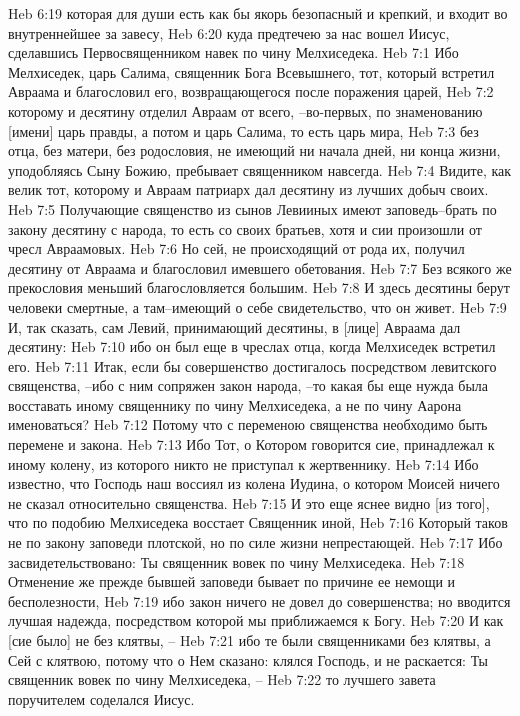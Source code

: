 Heb 6:19  которая для души есть как бы якорь безопасный и крепкий, и входит во внутреннейшее за завесу,
Heb 6:20  куда предтечею за нас вошел Иисус, сделавшись Первосвященником навек по чину Мелхиседека.
Heb 7:1  Ибо Мелхиседек, царь Салима, священник Бога Всевышнего, тот, который встретил Авраама и благословил его, возвращающегося после поражения царей,
Heb 7:2  которому и десятину отделил Авраам от всего, --во-первых, по знаменованию [имени] царь правды, а потом и царь Салима, то есть царь мира,
Heb 7:3  без отца, без матери, без родословия, не имеющий ни начала дней, ни конца жизни, уподобляясь Сыну Божию, пребывает священником навсегда.
Heb 7:4  Видите, как велик тот, которому и Авраам патриарх дал десятину из лучших добыч своих.
Heb 7:5  Получающие священство из сынов Левииных имеют заповедь--брать по закону десятину с народа, то есть со своих братьев, хотя и сии произошли от чресл Авраамовых.
Heb 7:6  Но сей, не происходящий от рода их, получил десятину от Авраама и благословил имевшего обетования.
Heb 7:7  Без всякого же прекословия меньший благословляется большим.
Heb 7:8  И здесь десятины берут человеки смертные, а там--имеющий о себе свидетельство, что он живет.
Heb 7:9  И, так сказать, сам Левий, принимающий десятины, в [лице] Авраама дал десятину:
Heb 7:10  ибо он был еще в чреслах отца, когда Мелхиседек встретил его.
Heb 7:11  Итак, если бы совершенство достигалось посредством левитского священства, --ибо с ним сопряжен закон народа, --то какая бы еще нужда была восставать иному священнику по чину Мелхиседека, а не по чину Аарона именоваться?
Heb 7:12  Потому что с переменою священства необходимо быть перемене и закона.
Heb 7:13  Ибо Тот, о Котором говорится сие, принадлежал к иному колену, из которого никто не приступал к жертвеннику.
Heb 7:14  Ибо известно, что Господь наш воссиял из колена Иудина, о котором Моисей ничего не сказал относительно священства.
Heb 7:15  И это еще яснее видно [из того], что по подобию Мелхиседека восстает Священник иной,
Heb 7:16  Который таков не по закону заповеди плотской, но по силе жизни непрестающей.
Heb 7:17  Ибо засвидетельствовано: Ты священник вовек по чину Мелхиседека.
Heb 7:18  Отменение же прежде бывшей заповеди бывает по причине ее немощи и бесполезности,
Heb 7:19  ибо закон ничего не довел до совершенства; но вводится лучшая надежда, посредством которой мы приближаемся к Богу.
Heb 7:20  И как [сие было] не без клятвы, --
Heb 7:21  ибо те были священниками без клятвы, а Сей с клятвою, потому что о Нем сказано: клялся Господь, и не раскается: Ты священник вовек по чину Мелхиседека, --
Heb 7:22  то лучшего завета поручителем соделался Иисус.
